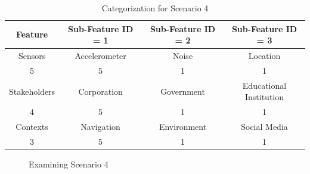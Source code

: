 \begin{table}[h!]
  \centering
  \caption{Categorization for Scenario 4}
  \label{tab:scenario4}
  \begin{tabular}{cccc}
    \toprule
    Feature & Sub-Feature ID = 1 & Sub-Feature ID = 2 & Sub-Feature ID = 3\\
    \midrule
    Sensors & Accelerometer & Noise & Location\\
     5 & 5 & 1 & 1\\ \hhline{====}
     Stakeholders & Corporation & Government & Educational Institution\\
     4 & 5 & 1 & 1\\ \hhline{====}
     Contexts & Navigation & Environment & Social Media\\
     3 & 5 & 1 & 1\\ 
    \bottomrule
  \end{tabular}
\end{table}

\begin{figure}[htp]
  \caption{Examining Scenario 4}
  \label{fig:scenatio4}
\end{figure}





